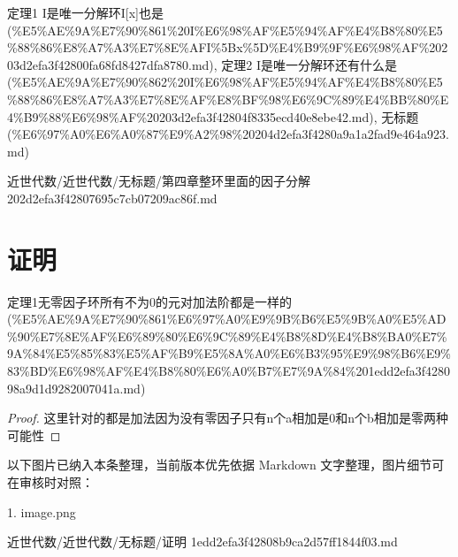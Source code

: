 \begin{note}[第四章整环里面的因子分解]
定理1 I是唯一分解环I[x]也是 (\%E5\%AE\%9A\%E7\%90\%861\%20I\%E6\%98\%AF\%E5\%94\%AF\%E4\%B8\%80\%E5\%88\%86\%E8\%A7\%A3\%E7\%8E\%AFI\%5Bx\%5D\%E4\%B9\%9F\%E6\%98\%AF\%20203d2efa3f42800fa68fd8427dfa8780.md), 定理2 I是唯一分解环还有什么是 (\%E5\%AE\%9A\%E7\%90\%862\%20I\%E6\%98\%AF\%E5\%94\%AF\%E4\%B8\%80\%E5\%88\%86\%E8\%A7\%A3\%E7\%8E\%AF\%E8\%BF\%98\%E6\%9C\%89\%E4\%BB\%80\%E4\%B9\%88\%E6\%98\%AF\%20203d2efa3f42804f8335ecd40e8ebe42.md), 无标题 (\%E6\%97\%A0\%E6\%A0\%87\%E9\%A2\%98\%20204d2efa3f4280a9a1a2fad9e464a923.md)

\end{note}

\begin{note}[来源路径]

近世代数/近世代数/无标题/第四章整环里面的因子分解 202d2efa3f42807695c7cb07209ac86f.md

\end{note}

\section*{证明}

\begin{note}[来源上级主题]

定理1无零因子环所有不为0的元对加法阶都是一样的 (\%E5\%AE\%9A\%E7\%90\%861\%E6\%97\%A0\%E9\%9B\%B6\%E5\%9B\%A0\%E5\%AD\%90\%E7\%8E\%AF\%E6\%89\%80\%E6\%9C\%89\%E4\%B8\%8D\%E4\%B8\%BA0\%E7\%9A\%84\%E5\%85\%83\%E5\%AF\%B9\%E5\%8A\%A0\%E6\%B3\%95\%E9\%98\%B6\%E9\%83\%BD\%E6\%98\%AF\%E4\%B8\%80\%E6\%A0\%B7\%E7\%9A\%84\%201edd2efa3f428098a9d1d9282007041a.md)

\end{note}

\begin{proof}

这里针对的都是加法因为没有零因子只有n个a相加是0和n个b相加是零两种可能性

\end{proof}

\begin{note}[关联图片]
以下图片已纳入本条整理，当前版本优先依据 Markdown 文字整理，图片细节可在审核时对照：

1. image.png\\

\end{note}

\begin{note}[来源路径]

近世代数/近世代数/无标题/证明 1edd2efa3f42808b9ca2d57ff1844f03.md

\end{note}

